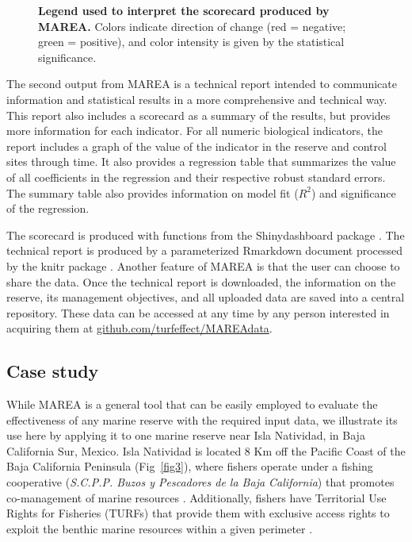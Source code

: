 \documentclass[10pt,letterpaper]{article}
\begin{document}
\begin{figure}[!h]
\caption{{\bf Legend used to interpret the scorecard produced by MAREA.}
Colors indicate direction of change (red = negative; green = positive), and color intensity is given by the statistical significance.}
\label{fig2}
\end{figure}

The second output from MAREA is a technical report intended to communicate information and statistical results in a more comprehensive and technical way. This report also includes a scorecard as a summary of the results, but provides more information for each indicator. For all numeric biological indicators, the report includes a graph of the value of the indicator in the reserve and control sites through time. It also provides a regression table that summarizes the value of all coefficients in the regression and their respective robust standard errors. The summary table also provides information on model fit (\(R^2\)) and significance of the regression.

The scorecard is produced with functions from the Shinydashboard package \cite{shinydashboard_2017}. The technical report is produced by a parameterized Rmarkdown document \cite{rmarkdown_2017} processed by the knitr package \cite{knitr_2017}. Another feature of MAREA is that the user can choose to share the data. Once the technical report is downloaded, the information on the reserve, its management objectives, and all uploaded data are saved into a central repository. These data can be accessed at any time by any person interested in acquiring them at \url{github.com/turfeffect/MAREAdata}.

\subsection*{Case study}\label{case-study}

While MAREA is a general tool that can be easily employed to evaluate the effectiveness of any marine reserve with the required input data, we illustrate its use here by applying it to one marine reserve near Isla Natividad, in Baja California Sur, Mexico. Isla Natividad is located 8 Km off the Pacific Coast of the Baja California Peninsula (Fig~\ref{fig3}), where fishers operate under a fishing cooperative (\emph{S.C.P.P. Buzos y Pescadores de la Baja California}) that promotes co-management of marine resources \cite{mccay_2017-1m,mccay_2014-CN}. Additionally, fishers have Territorial Use Rights for Fisheries (TURFs) that provide them with exclusive access rights to exploit the benthic marine resources within a given perimeter \cite{mccay_2014-CN}.
\end{document}

